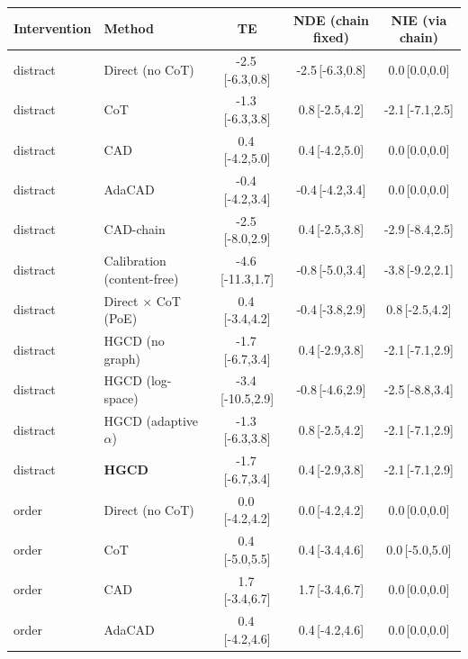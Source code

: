 \begin{tabular}{llccc}
\toprule
Intervention & Method & TE & NDE (chain fixed) & NIE (via chain) \\
\midrule
distract & Direct (no CoT) & -2.5\,{\scriptsize[-6.3,0.8]} & -2.5\,{\scriptsize[-6.3,0.8]} & 0.0\,{\scriptsize[0.0,0.0]} \\
distract & CoT & -1.3\,{\scriptsize[-6.3,3.8]} & 0.8\,{\scriptsize[-2.5,4.2]} & -2.1\,{\scriptsize[-7.1,2.5]} \\
distract & CAD & 0.4\,{\scriptsize[-4.2,5.0]} & 0.4\,{\scriptsize[-4.2,5.0]} & 0.0\,{\scriptsize[0.0,0.0]} \\
distract & AdaCAD & -0.4\,{\scriptsize[-4.2,3.4]} & -0.4\,{\scriptsize[-4.2,3.4]} & 0.0\,{\scriptsize[0.0,0.0]} \\
distract & CAD-chain & -2.5\,{\scriptsize[-8.0,2.9]} & 0.4\,{\scriptsize[-2.5,3.8]} & -2.9\,{\scriptsize[-8.4,2.5]} \\
distract & Calibration (content-free) & -4.6\,{\scriptsize[-11.3,1.7]} & -0.8\,{\scriptsize[-5.0,3.4]} & -3.8\,{\scriptsize[-9.2,2.1]} \\
distract & Direct $\times$ CoT (PoE) & 0.4\,{\scriptsize[-3.4,4.2]} & -0.4\,{\scriptsize[-3.8,2.9]} & 0.8\,{\scriptsize[-2.5,4.2]} \\
distract & HGCD (no graph) & -1.7\,{\scriptsize[-6.7,3.4]} & 0.4\,{\scriptsize[-2.9,3.8]} & -2.1\,{\scriptsize[-7.1,2.9]} \\
distract & HGCD (log-space) & -3.4\,{\scriptsize[-10.5,2.9]} & -0.8\,{\scriptsize[-4.6,2.9]} & -2.5\,{\scriptsize[-8.8,3.4]} \\
distract & HGCD (adaptive $\alpha$) & -1.3\,{\scriptsize[-6.3,3.8]} & 0.8\,{\scriptsize[-2.5,4.2]} & -2.1\,{\scriptsize[-7.1,2.9]} \\
distract & \textbf{HGCD} & -1.7\,{\scriptsize[-6.7,3.4]} & 0.4\,{\scriptsize[-2.9,3.8]} & -2.1\,{\scriptsize[-7.1,2.9]} \\
\midrule
order & Direct (no CoT) & 0.0\,{\scriptsize[-4.2,4.2]} & 0.0\,{\scriptsize[-4.2,4.2]} & 0.0\,{\scriptsize[0.0,0.0]} \\
order & CoT & 0.4\,{\scriptsize[-5.0,5.5]} & 0.4\,{\scriptsize[-3.4,4.6]} & 0.0\,{\scriptsize[-5.0,5.0]} \\
order & CAD & 1.7\,{\scriptsize[-3.4,6.7]} & 1.7\,{\scriptsize[-3.4,6.7]} & 0.0\,{\scriptsize[0.0,0.0]} \\
order & AdaCAD & 0.4\,{\scriptsize[-4.2,4.6]} & 0.4\,{\scriptsize[-4.2,4.6]} & 0.0\,{\scriptsize[0.0,0.0]} \\

\end{tabular}

